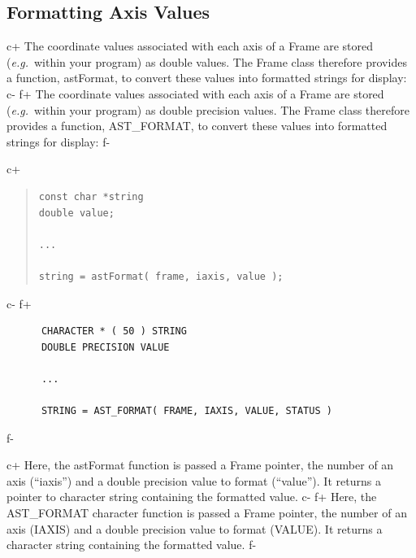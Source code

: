 \documentclass[twoside,11pt]{article}
\begin{document}
\subsection{\label{ss:formattingaxisvalues}Formatting Axis Values}

c+
The coordinate values associated with each axis of a Frame are stored
({\em{e.g.}}\ within your program) as double values. The Frame class
therefore provides a function, astFormat, to convert these values into
formatted strings for display:
c-
f+
The coordinate values associated with each axis of a Frame are stored
({\em{e.g.}}\ within your program) as double precision values. The
Frame class therefore provides a function, AST\_FORMAT, to convert
these values into formatted strings for display:
f-

c+
\begin{quote}
\small
\begin{verbatim}
const char *string
double value;

...

string = astFormat( frame, iaxis, value );
\end{verbatim}
\normalsize
\end{quote}
c-
f+
\small
\begin{verbatim}
      CHARACTER * ( 50 ) STRING
      DOUBLE PRECISION VALUE

      ...

      STRING = AST_FORMAT( FRAME, IAXIS, VALUE, STATUS )
\end{verbatim}
\normalsize
f-

c+
Here, the astFormat function is passed a Frame pointer, the number of
an axis (``iaxis'') and a double precision value to format
(``value''). It returns a pointer to character string containing the
formatted value.
c-
f+
Here, the AST\_FORMAT character function is passed a Frame pointer,
the number of an axis (IAXIS) and a double precision value to format
(VALUE). It returns a character string containing the formatted value.
f-
\label{ss:formattingwithdigits}
\end{document}
